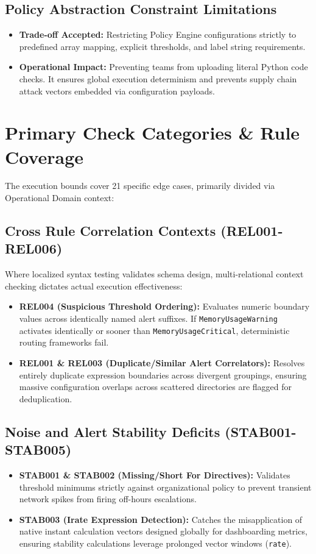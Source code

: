 \documentclass[a4paper,11pt]{article}
\begin{document}
\subsection{Policy Abstraction Constraint Limitations}
\begin{itemize}
    \item \textbf{Trade-off Accepted:} Restricting Policy Engine configurations strictly to predefined array mapping, explicit thresholds, and label string requirements.
    \item \textbf{Operational Impact:} Preventing teams from uploading literal Python code checks. It ensures global execution determinism and prevents supply chain attack vectors embedded via configuration payloads.
\end{itemize}

\section{Primary Check Categories \& Rule Coverage}
The execution bounds cover 21 specific edge cases, primarily divided via Operational Domain context:

\subsection{Cross Rule Correlation Contexts (REL001-REL006)}
Where localized syntax testing validates schema design, multi-relational context checking dictates actual execution effectiveness:
\begin{itemize}
    \item \textbf{REL004 (Suspicious Threshold Ordering):} Evaluates numeric boundary values across identically named alert suffixes. If \texttt{MemoryUsageWarning} activates identically or sooner than \texttt{MemoryUsageCritical}, deterministic routing frameworks fail.
    \item \textbf{REL001 \& REL003 (Duplicate/Similar Alert Correlators):} Resolves entirely duplicate expression boundaries across divergent groupings, ensuring massive configuration overlaps across scattered directories are flagged for deduplication.
\end{itemize}

\subsection{Noise and Alert Stability Deficits (STAB001-STAB005)}
\begin{itemize}
    \item \textbf{STAB001 \& STAB002 (Missing/Short For Directives):} Validates threshold minimums strictly against organizational policy to prevent transient network spikes from firing off-hours escalations.
    \item \textbf{STAB003 (Irate Expression Detection):} Catches the misapplication of native instant calculation vectors designed globally for dashboarding metrics, ensuring stability calculations leverage prolonged vector windows (\texttt{rate}).
\end{itemize}
\end{document}
